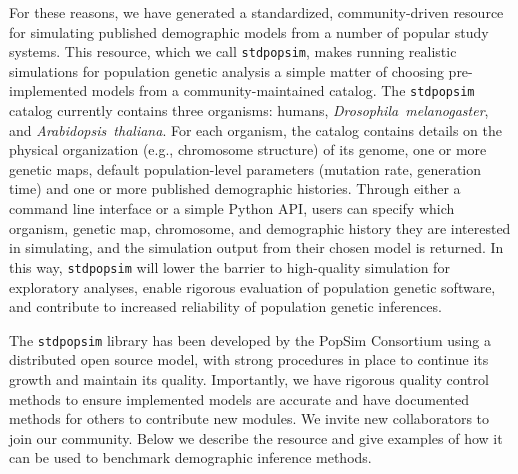 \documentclass[12pt,halfline,a4paper]{ouparticle}
\newcommand{\stdpopsim}{\texttt{stdpopsim}\xspace}
\begin{document}
For these reasons, we have generated a standardized, community-driven resource
for simulating published demographic models from a number of popular study systems.
This resource, which we call \stdpopsim, makes running
realistic simulations for population genetic analysis a simple matter of
choosing pre-implemented models from a community-maintained catalog.
The \stdpopsim catalog currently contains three organisms: humans,
\emph{Drosophila~melanogaster}, and \emph{Arabidopsis~thaliana}. For each
organism, the catalog contains details on the physical organization (e.g., chromosome structure)
of its genome, one or more genetic maps, default population-level parameters (mutation rate,
generation time) and one or more published demographic histories. Through
either a command line interface or a simple Python API, users can specify which
organism, genetic map, chromosome, and demographic history they are interested in simulating, and the
simulation output from their chosen model is returned.
In this way, \stdpopsim will lower the barrier to high-quality simulation for exploratory analyses,
enable rigorous evaluation of population genetic software,
and contribute to increased reliability of population genetic inferences.

The \stdpopsim library has been developed by the PopSim Consortium using a
distributed open source model, with strong procedures in place
to continue its growth and maintain its quality.
Importantly, we have rigorous quality control methods to ensure implemented models are accurate
and have documented methods for others to contribute new modules.
We invite new collaborators to join our community.
Below we describe the resource and give
examples of how it can be used to benchmark demographic inference methods.
\end{document}
